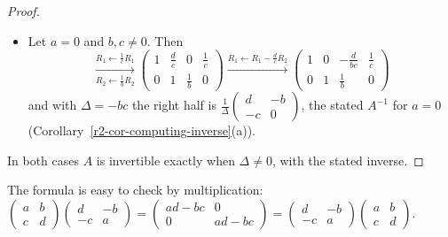 \documentclass[12pt]{article}
\theoremstyle{definition}
\begin{document}
\begin{proof}
\begin{itemize}
\[
\left(\begin{array}{cc|cc}0&b&1&0\\c&d&0&1\end{array}\right)
\xrightarrow{R_1\leftrightarrow R_2}
\left(\begin{array}{cc|cc}c&d&0&1\\0&b&1&0\end{array}\right)
\]
If \(b=0\), the left half has a zero row, and \(A\) is not invertible (Corollary~\ref{r2-cor-computing-inverse}(b)).
So for \(a=0\), \(A\) is invertible only if
\(b\ne0\) and \(c\ne0\), that is, only if \(\Delta=-bc\ne0\).
\item Let \(a=0\) and \(b,c\ne0\). Then
\[
\xrightarrow[R_2\leftarrow\frac1bR_2]{R_1\leftarrow\frac1cR_1}
\left(\begin{array}{cc|cc}1&\frac dc&0&\frac1c\\0&1&\frac1b&0\end{array}\right)
\xrightarrow{R_1\leftarrow R_1-\frac dcR_2}
\left(\begin{array}{cc|cc}1&0&-\frac d{bc}&\frac1c\\0&1&\frac1b&0\end{array}\right)
\]
and with \(\Delta=-bc\) the right half is \(\frac1\Delta\left(\begin{smallmatrix}d&-b\\-c&0\end{smallmatrix}\right)\),
the stated \(A^{-1}\) for \(a=0\) (Corollary~\ref{r2-cor-computing-inverse}(a)).
\end{itemize}
In both cases \(A\) is invertible exactly when \(\Delta\ne0\), with the stated inverse.
\end{proof}
The formula is easy to check by multiplication:
\(\left(\begin{smallmatrix}a&b\\c&d\end{smallmatrix}\right)\left(\begin{smallmatrix}d&-b\\-c&a\end{smallmatrix}\right)
=\left(\begin{smallmatrix}ad-bc&0\\0&ad-bc\end{smallmatrix}\right)
=\left(\begin{smallmatrix}d&-b\\-c&a\end{smallmatrix}\right)\left(\begin{smallmatrix}a&b\\c&d\end{smallmatrix}\right)\).
\end{document}
